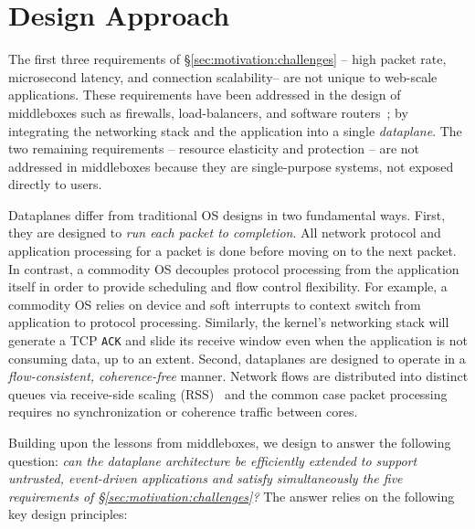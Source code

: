 \section{\ix Design Approach}
\label{sec:design}

The first three requirements of \S\ref{sec:motivation:challenges} --
high packet rate, microsecond latency, and connection scalability--
are not unique to web-scale applications.  These requirements have
been addressed in the design of middleboxes such as firewalls,
load-balancers, and software
routers~\cite{routebricks,click};
by integrating the networking stack and the application into a single
\emph{dataplane}. The two remaining requirements -- resource
elasticity and protection -- are not addressed in middleboxes because
they are single-purpose systems, not exposed directly to users.

Dataplanes differ from traditional OS designs in two fundamental
ways. First, they are designed to \emph{run each packet to
  completion}. All network protocol and application processing for a
packet is done before moving on to the next packet.  In contrast, a
commodity OS decouples protocol processing from the application itself
in order to provide scheduling and flow control flexibility.  For
example, a commodity OS relies on device and soft interrupts to
context switch from application to protocol processing. Similarly, the
kernel's networking stack will generate a TCP \texttt{ACK} and slide
its receive window even when the application is not consuming data, up
to an extent. Second, dataplanes are designed to operate in a
\emph{flow-consistent, coherence-free} manner.  Network flows are
distributed into distinct queues via receive-side scaling
(RSS)~\cite{url:rss} and the common case packet processing requires no
synchronization or coherence traffic between cores.

Building upon the lessons from middleboxes, we design \ix to answer
the following question: {\it {} can the dataplane architecture be
  efficiently extended to support untrusted, event-driven applications
  and satisfy simultaneously the five requirements of
  \S\ref{sec:motivation:challenges}?}  The answer relies on the
following key design principles:



